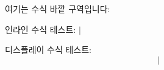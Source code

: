 \documentclass{article}
\begin{document}

여기는 수식 바깥 구역입니다: 



인라인 수식 테스트: $|$



디스플레이 수식 테스트:
$$
  |
$$
\end{document}
